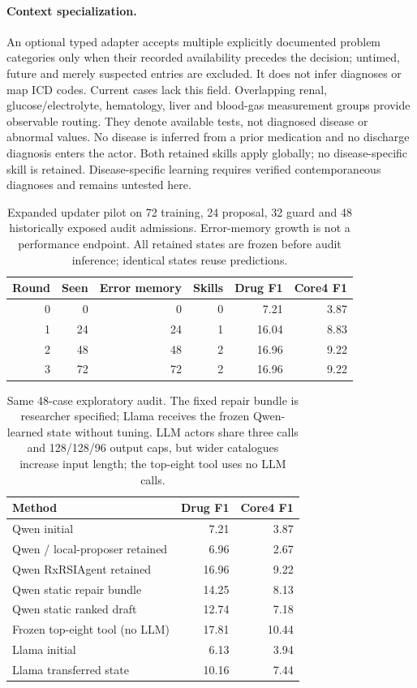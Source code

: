 \paragraph{Context specialization.} An optional typed adapter accepts multiple explicitly documented problem categories only when their recorded availability precedes the decision; untimed, future and merely suspected entries are excluded. It does not infer diagnoses or map ICD codes. Current cases lack this field. Overlapping renal, glucose/electrolyte, hematology, liver and blood-gas measurement groups provide observable routing. They denote available tests, not diagnosed disease or abnormal values. No disease is inferred from a prior medication and no discharge diagnosis enters the actor. Both retained skills apply globally; no disease-specific skill is retained. Disease-specific learning requires verified contemporaneous diagnoses and remains untested here.
\begin{table}[t]\centering\small
\setlength{\tabcolsep}{4pt}
\caption{Expanded updater pilot on 72 training, 24 proposal, 32 guard and 48 historically exposed audit admissions. Error-memory growth is not a performance endpoint. All retained states are frozen before audit inference; identical states reuse predictions.}
\label{tab:boundedtrajectory}
\begin{tabular}{@{}rrrrrr@{}}\toprule
Round & Seen & Error memory & Skills & Drug F1 & Core4 F1\\\midrule
0 & 0 & 0 & 0 & 7.21 & 3.87\\
1 & 24 & 24 & 1 & 16.04 & 8.83\\
2 & 48 & 48 & 2 & 16.96 & 9.22\\
3 & 72 & 72 & 2 & 16.96 & 9.22\\
\bottomrule\end{tabular}
\end{table}\begin{table}[t]\centering\small
\setlength{\tabcolsep}{4pt}
\caption{Same 48-case exploratory audit. The fixed repair bundle is researcher specified; Llama receives the frozen Qwen-learned state without tuning. LLM actors share three calls and 128/128/96 output caps, but wider catalogues increase input length; the top-eight tool uses no LLM calls.}
\label{tab:boundedcontrols}
\begin{tabular}{@{}lrr@{}}\toprule
Method & Drug F1 & Core4 F1\\\midrule
Qwen initial & 7.21 & 3.87\\
Qwen / local-proposer retained & 6.96 & 2.67\\
Qwen RxRSIAgent retained & 16.96 & 9.22\\
Qwen static repair bundle & 14.25 & 8.13\\
Qwen static ranked draft & 12.74 & 7.18\\
Frozen top-eight tool (no LLM) & 17.81 & 10.44\\
Llama initial & 6.13 & 3.94\\
Llama transferred state & 10.16 & 7.44\\
\bottomrule\end{tabular}
\end{table}
